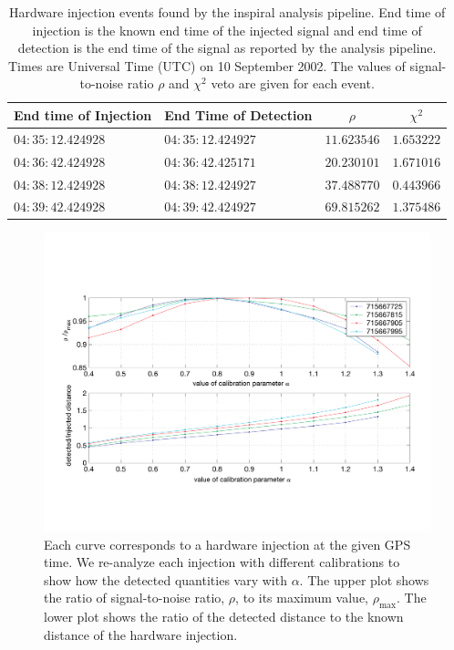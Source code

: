 \begin{table}[p]
  \begin{flushright}
  \begin{tabular}{l|l|c|c}
  End time of Injection&End Time of Detection&$\rho$&$\chi^2$\\
  \hline
  $04:35:12.424928$ & $04:35:12.424927$ & $11.623546$ & $1.653222$ \\
  $04:36:42.424928$ & $04:36:42.425171$ & $20.230101$ & $1.671016$ \\
  $04:38:12.424928$ & $04:38:12.424927$ & $37.488770$ & $0.443966$ \\
  $04:39:42.424928$ & $04:39:42.424927$ & $69.815262$ & $1.375486$ \\
  \end{tabular}
  \end{flushright}
  \caption[Hardware Injections Found by the Analysis Pipeline]{%
  Hardware injection events found by the inspiral analysis pipeline. End time
  of injection is the known end time of the injected signal and end time of
  detection is the end time of the signal as reported by the analysis
  pipeline. Times are Universal Time (UTC) on 10 September 2002. The values of
  signal-to-noise ratio $\rho$ and $\chi^2$ veto are given for each event.
  }
\label{t:triggers}
\end{table}

\begin{figure}[p]
  \vspace{5pt}
  \begin{flushright}
    \includegraphics[width=\textwidth]{figures/hardware/calibration}    
  \end{flushright}
  \caption[Study of Calibration Using Hardware Injections]{%
  Each curve corresponds to a hardware injection at the given GPS time. We
  re-analyze each injection with different calibrations to show how the
  detected quantities vary with $\alpha$. The upper plot shows the ratio of
  signal-to-noise ratio, $\rho$, to its maximum value, $\rho_{\mathrm{max}}$.
  The lower plot shows the ratio of the detected distance to the known distance of
  the hardware injection.
  }
\label{f:calibration}
\end{figure}

